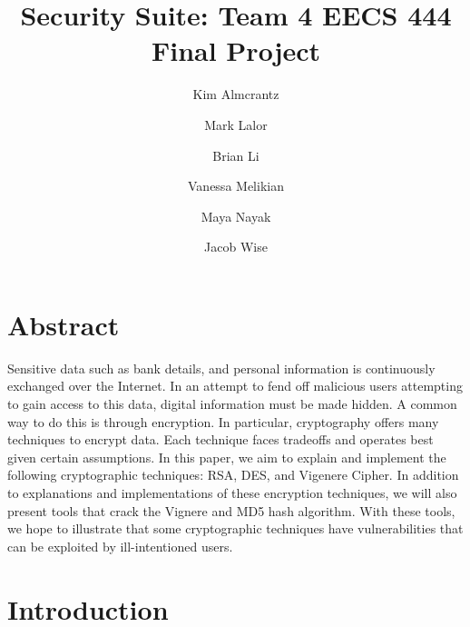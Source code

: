 \documentclass[acmlarge]{acmart}
\begin{document}
\title{Security Suite: Team 4 EECS 444 Final Project}

\author{Kim Almcrantz}

\author{Mark Lalor}

\author{Brian Li}

\author{Vanessa Melikian}

\author{Maya Nayak}

\author{Jacob Wise}


\maketitle


\section{Abstract}
Sensitive data such as bank details, and personal information is continuously exchanged over the Internet. In an attempt to fend off malicious users attempting to gain access to this data, digital information must be made hidden. A common way to do this is through encryption. In particular, cryptography offers many techniques to encrypt data. Each technique faces tradeoffs and operates best given certain assumptions. In this paper, we aim to explain and implement the following cryptographic techniques: RSA, DES, and Vigenere Cipher. In addition to explanations and implementations of these encryption techniques, we will also present tools that crack the Vignere and MD5 hash algorithm. With these tools, we hope to illustrate that some cryptographic techniques have vulnerabilities that can be exploited by ill-intentioned users.


\section{Introduction}\label{sec:intro}
\end{document}
